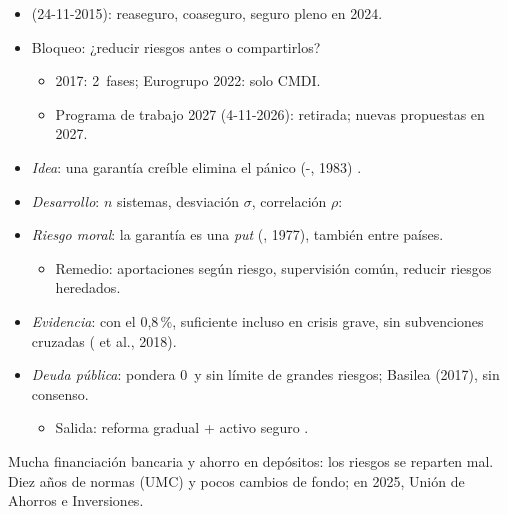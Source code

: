 \documentclass{article}
\begin{document}
\begin{columnas}
\begin{itemize}
\item {} (24-11-2015): reaseguro, coaseguro, seguro pleno en 2024.
\item Bloqueo: ¿reducir riesgos antes o compartirlos?
  \begin{itemize}
  \item 2017: 2~fases; Eurogrupo 2022: solo CMDI.
  \item Programa de trabajo 2027 (4-11-2026): retirada; nuevas propuestas en 2027.
  \end{itemize}
\end{itemize}
\begin{itemize}
\item \emph{Idea}: una garantía creíble elimina el pánico (-, 1983) .
\item \emph{Desarrollo}: $n$ sistemas, desviación $\sigma$, correlación $\rho$:
\item \emph{Riesgo moral}: la garantía es una \emph{put} (, 1977), también entre países.
  \begin{itemize}
  \item Remedio: aportaciones según riesgo, supervisión común, reducir riesgos heredados.
  \end{itemize}
\item \emph{Evidencia}: con el 0,8\,\%, suficiente incluso en crisis grave, sin subvenciones cruzadas ( et al., 2018).
\end{itemize}
\begin{itemize}
\item \emph{Deuda pública}: pondera 0~y sin límite de grandes riesgos; Basilea (2017), sin consenso.
  \begin{itemize}
  \item Salida: reforma gradual + activo seguro .
  \end{itemize}
\end{itemize}

\begin{ideaclave}
Mucha financiación bancaria y ahorro en depósitos: los riesgos se reparten mal. Diez años de normas (UMC) y pocos cambios de fondo; en 2025, Unión de Ahorros e Inversiones.
\end{ideaclave}


\end{columnas}
\end{document}
